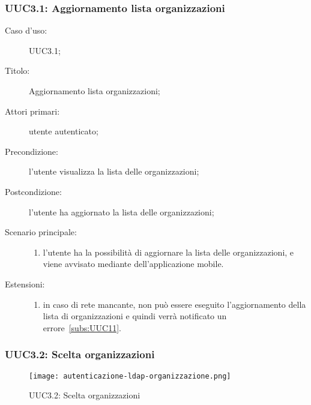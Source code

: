 \documentclass[../../../analisi-dei-requisiti.tex]{subfiles}
\begin{document}
\subsubsection{UUC3.1: Aggiornamento lista organizzazioni}%
\label{subs:UUC3.1}
\begin{description}
  \item[Caso d’uso:] UUC3.1;
  \item[Titolo:] Aggiornamento lista organizzazioni;
  \item[Attori primari:] utente autenticato;
  \item[Precondizione:] l'utente visualizza la lista delle organizzazioni;
  \item[Postcondizione:] l'utente ha aggiornato la lista delle organizzazioni;
  \item[Scenario principale:]
        \begin{enumerate}
          \item l'utente ha la possibilità di aggiornare la lista delle organizzazioni, e viene avvisato mediante  dell'applicazione mobile.
        \end{enumerate}
  \item[Estensioni:]
        \begin{enumerate}
          \item in caso di rete mancante, non può essere eseguito l'aggiornamento della lista di organizzazioni e quindi verrà notificato un errore~\ref{subs:UUC11}.
        \end{enumerate}
\end{description}


\subsubsection{UUC3.2: Scelta organizzazioni}%
\label{subs:UUC3.2}

\begin{figure}[H]
  \centering
  \texttt{[image: autenticazione-ldap-organizzazione.png]}
  \caption{UUC3.2: Scelta organizzazioni}%
  \label{fig:UUC3.2}
\end{figure}
\end{document}
